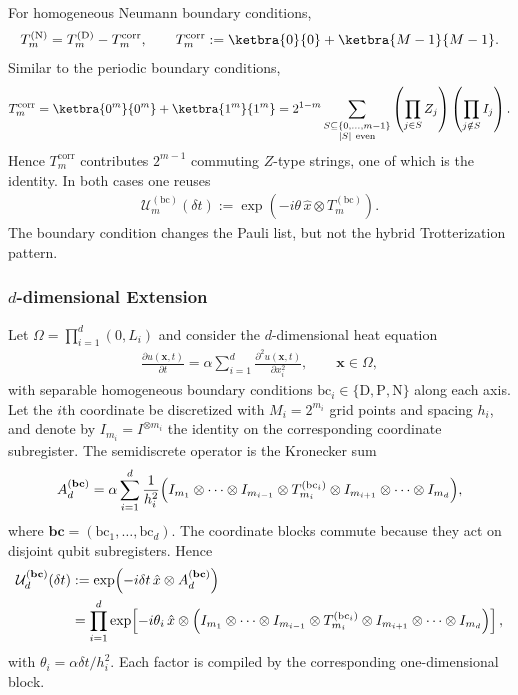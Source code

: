 \documentclass{article}
\begin{document}
For homogeneous Neumann boundary conditions,
\begin{align}
    T_m^{(\mathrm N)} = T_m^{(\mathrm D)} - T_m^{\mathrm{corr}},
    \qquad
    T_m^{\mathrm{corr}} := \ketbra{0}{0} + \ketbra{M-1}{M-1}.
\end{align}
Similar to the periodic boundary conditions,
\begin{align}
    T_m^{\mathrm{corr}} =
    \ketbra{0^m}{0^m} + \ketbra{1^m}{1^m} =
    2^{1-m}
    \sum_{\substack{S\subseteq\{0,\dots,m-1\}\\ |S|\ \mathrm{even}}}
    \left(\prod_{j\in S}Z_j\right)\left(\prod_{j\notin S}I_j\right).
\end{align}
Hence $T_m^{\mathrm{corr}}$ contributes $2^{m-1}$ commuting $Z$-type strings, one of which is the identity. In both cases one reuses
\begin{align}
    \mathcal U_m^{(\mathrm{bc})}(\delta t)
    :=
    \exp\!\left(-i\theta\,\hat x \otimes T_m^{(\mathrm{bc})}\right).
\end{align}
The boundary condition changes the Pauli list, but not the hybrid Trotterization pattern.

\subsubsection{$d$-dimensional Extension}

Let $\Omega=\prod_{i=1}^d(0,L_i)$ and consider the $d$-dimensional heat equation
\begin{align}
    \frac{\partial u(\mathbf{x},t)}{\partial t}
    =
    \alpha \sum_{i=1}^d \frac{\partial^2 u(\mathbf{x},t)}{\partial x_i^2},
    \qquad
    \mathbf{x}\in\Omega,
\end{align}
with separable homogeneous boundary conditions $\mathrm{bc}_i\in\{\mathrm D,\mathrm P,\mathrm N\}$ along each axis. Let the $i$th coordinate be discretized with $M_i=2^{m_i}$ grid points and spacing $h_i$, and denote by $I_{m_i}=I^{\otimes m_i}$ the identity on the corresponding coordinate subregister. The semidiscrete operator is the Kronecker sum
\begin{align}
    A_d^{(\mathbf{bc})}
    =
    \alpha \sum_{i=1}^d \frac{1}{h_i^2}
    \Bigl(
        I_{m_1}\otimes \cdots \otimes I_{m_{i-1}}
        \otimes T_{m_i}^{(\mathrm{bc}_i)}
        \otimes I_{m_{i+1}} \otimes \cdots \otimes I_{m_d}
    \Bigr),
\end{align}
where $\mathbf{bc}=(\mathrm{bc}_1,\dots,\mathrm{bc}_d)$. The coordinate blocks commute because they act on disjoint qubit subregisters. Hence
\begin{align}
    \mathcal U_d^{(\mathbf{bc})}(\delta t)
    &:=
    \exp\!\left(-i\delta t\,\hat x \otimes A_d^{(\mathbf{bc})}\right) \nonumber \\
    &=
    \prod_{i=1}^d
    \exp\!\left[
        -i\theta_i\,\hat x \otimes
        \Bigl(
            I_{m_1}\otimes \cdots \otimes I_{m_{i-1}}
            \otimes T_{m_i}^{(\mathrm{bc}_i)}
            \otimes I_{m_{i+1}} \otimes \cdots \otimes I_{m_d}
        \Bigr)
    \right],
\end{align}
with $\theta_i=\alpha\delta t/h_i^2$. Each factor is compiled by the corresponding one-dimensional block.
\end{document}
